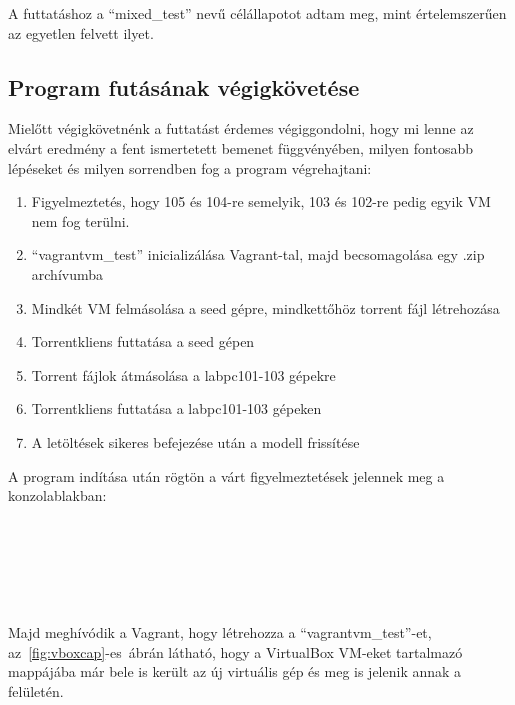 A futtatáshoz a ``mixed\_test'' nevű célállapotot adtam meg, mint értelemszerűen az egyetlen felvett ilyet.

%
\subsection{Program futásának végigkövetése}
%

Mielőtt végigkövetnénk a futtatást érdemes végiggondolni, hogy mi lenne az elvárt eredmény a fent ismertetett bemenet függvényében, milyen fontosabb lépéseket és milyen sorrendben fog a program végrehajtani:

\begin{enumerate}
  \item Figyelmeztetés, hogy 105 és 104-re semelyik, 103 és 102-re pedig egyik VM nem fog terülni.
  \item ``vagrantvm\_test'' inicializálása Vagrant-tal, majd becsomagolása egy .zip archívumba
  \item Mindkét VM felmásolása a seed gépre, mindkettőhöz torrent fájl létrehozása
  \item Torrentkliens futtatása a seed gépen
  \item Torrent fájlok átmásolása a labpc101-103 gépekre
  \item Torrentkliens futtatása a labpc101-103 gépeken
  \item A letöltések sikeres befejezése után a modell frissítése
\end{enumerate}

A program indítása után rögtön a várt figyelmeztetések jelennek meg a konzolablakban:\\\\
\\
\\
\\
\\\\
Majd meghívódik a Vagrant, hogy létrehozza a ``vagrantvm\_test''-et, az~\ref{fig:vboxcap}-es~ábrán látható, hogy a VirtualBox VM-eket tartalmazó mappájába már bele is került az új virtuális gép és meg is jelenik annak a felületén.

